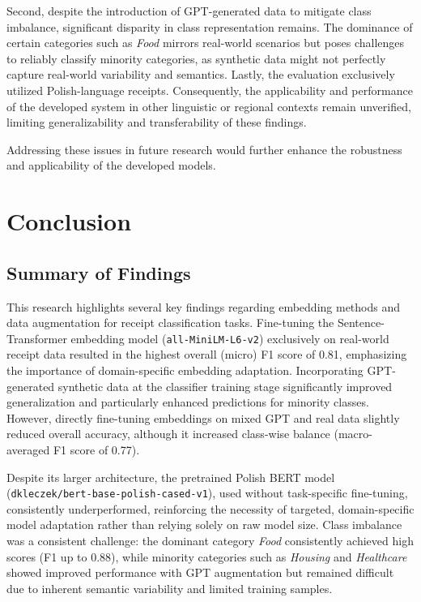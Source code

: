 \documentclass{SGGW-thesis-EN}
\begin{document}
Second, despite the introduction of GPT-generated data to mitigate class imbalance, significant disparity in class representation remains.  
The dominance of certain categories such as \emph{Food} mirrors real-world scenarios but poses challenges to reliably classify minority categories, as synthetic data might not perfectly capture real-world variability and semantics.
Lastly, the evaluation exclusively utilized Polish-language receipts.  
Consequently, the applicability and performance of the developed system in other linguistic or regional contexts remain unverified, limiting generalizability and transferability of these findings.

Addressing these issues in future research would further enhance the robustness and applicability of the developed models.


\chapter{Conclusion}

\section{Summary of Findings}
This research highlights several key findings regarding embedding methods and data augmentation for receipt  
classification tasks. Fine-tuning the Sentence-Transformer embedding model (\texttt{all-MiniLM-L6-v2})  
exclusively on real-world receipt data resulted in the highest overall (micro) F1 score of 0.81, emphasizing  
the importance of domain-specific embedding adaptation. Incorporating GPT-generated synthetic data at the  
classifier training stage significantly improved generalization and particularly enhanced predictions for  
minority classes. However, directly fine-tuning embeddings on mixed GPT and real data slightly reduced overall  
accuracy, although it increased class-wise balance (macro-averaged F1 score of 0.77).  

Despite its larger architecture, the pretrained Polish BERT model \newline (\texttt{dkleczek/bert-base-polish-cased-v1}),  
used without task-specific fine-tuning, consistently underperformed, reinforcing the necessity of targeted,  
domain-specific model adaptation rather than relying solely on raw model size. Class imbalance was a consistent  
challenge: the dominant category \emph{Food} consistently achieved high scores (F1 up to 0.88), while minority  
categories such as \emph{Housing} and \emph{Healthcare} showed improved performance with GPT augmentation but  
remained difficult due to inherent semantic variability and limited training samples.
\end{document}
